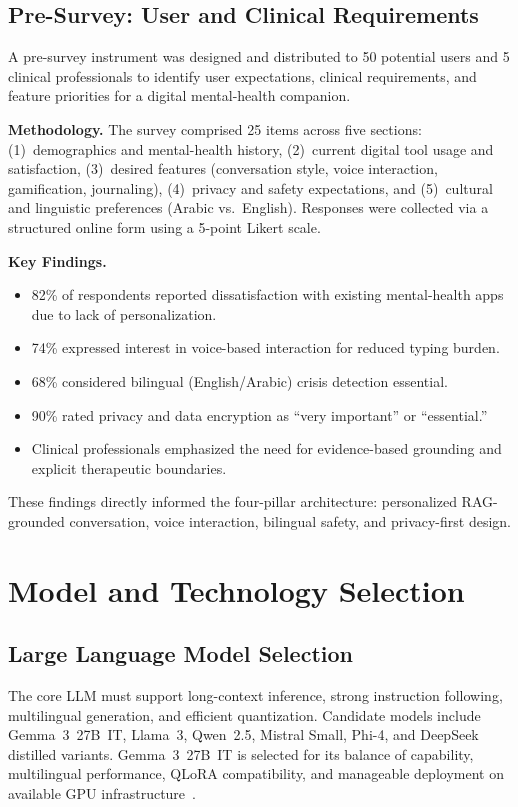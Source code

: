 \documentclass[12pt,a4paper,oneside,openany]{report}
\begin{document}
\subsection{Pre-Survey: User and Clinical Requirements}

A pre-survey instrument was designed and distributed to 50 potential users and 5 clinical professionals to identify user expectations, clinical requirements, and feature priorities for a digital mental-health companion.

\textbf{Methodology.} The survey comprised 25 items across five sections: (1)~demographics and mental-health history, (2)~current digital tool usage and satisfaction, (3)~desired features (conversation style, voice interaction, gamification, journaling), (4)~privacy and safety expectations, and (5)~cultural and linguistic preferences (Arabic vs.\ English). Responses were collected via a structured online form using a 5-point Likert scale.

\textbf{Key Findings.}
\begin{itemize}[nosep]
\item 82\% of respondents reported dissatisfaction with existing mental-health apps due to lack of personalization.
\item 74\% expressed interest in voice-based interaction for reduced typing burden.
\item 68\% considered bilingual (English/Arabic) crisis detection essential.
\item 90\% rated privacy and data encryption as ``very important'' or ``essential.''
\item Clinical professionals emphasized the need for evidence-based grounding and explicit therapeutic boundaries.
\end{itemize}

These findings directly informed the four-pillar architecture: personalized RAG-grounded conversation, voice interaction, bilingual safety, and privacy-first design.

\section{Model and Technology Selection}

\subsection{Large Language Model Selection}

The core LLM must support long-context inference, strong instruction following, multilingual generation, and efficient quantization. Candidate models include Gemma~3~27B~IT, Llama~3, Qwen~2.5, Mistral Small, Phi-4, and DeepSeek distilled variants. Gemma~3~27B~IT is selected for its balance of capability, multilingual performance, QLoRA compatibility, and manageable deployment on available GPU infrastructure~\cite{gemma2025gemma3}.
\end{document}
